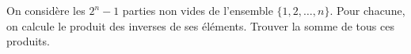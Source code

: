 On considère les $2^n - 1$ parties non vides de l'ensemble $\{1, 2, \ldots, n\}$. Pour chacune, on calcule le produit des inverses de ses éléments. Trouver la somme de tous ces produits.
